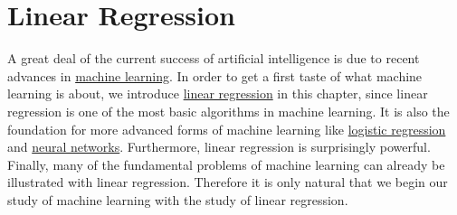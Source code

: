 \chapter{Linear Regression}
A great deal of the current success of artificial intelligence is due to recent advances in
\href{https://en.wikipedia.org/wiki/Machine_learning}{machine learning}.  
In order to get a first taste of what machine learning is about, we introduce 
\href{https://en.wikipedia.org/wiki/Linear_regression}{linear regression} 
in this chapter, since linear regression
is one of the most basic algorithms in machine learning.  It is also the foundation for more advanced
forms of machine learning like \href{https://en.wikipedia.org/wiki/Logistic_regression}{logistic regression} and 
\href{https://en.wikipedia.org/wiki/Artificial_neural_network}{neural networks}.
Furthermore, linear regression is surprisingly powerful.  Finally, many of the fundamental problems of machine
learning can already be illustrated with linear regression.  Therefore it is only natural that we begin our
study of machine learning with the study of linear regression.

